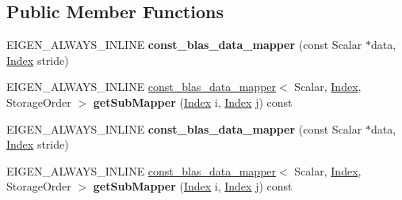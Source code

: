 \subsection*{Public Member Functions}
\begin{DoxyCompactItemize}
\item 
\mbox{\label{class_eigen_1_1internal_1_1const__blas__data__mapper_ae18b6a511e6f40baf1ec5936ee16e248}} 
E\+I\+G\+E\+N\+\_\+\+A\+L\+W\+A\+Y\+S\+\_\+\+I\+N\+L\+I\+NE {\bfseries const\+\_\+blas\+\_\+data\+\_\+mapper} (const Scalar $\ast$data, \hyperlink{namespace_eigen_a62e77e0933482dafde8fe197d9a2cfde}{Index} stride)
\item 
\mbox{\label{class_eigen_1_1internal_1_1const__blas__data__mapper_ae630dbeda283542d68ee615c2cdf4d53}} 
E\+I\+G\+E\+N\+\_\+\+A\+L\+W\+A\+Y\+S\+\_\+\+I\+N\+L\+I\+NE \hyperlink{class_eigen_1_1internal_1_1const__blas__data__mapper}{const\+\_\+blas\+\_\+data\+\_\+mapper}$<$ Scalar, \hyperlink{namespace_eigen_a62e77e0933482dafde8fe197d9a2cfde}{Index}, Storage\+Order $>$ {\bfseries get\+Sub\+Mapper} (\hyperlink{namespace_eigen_a62e77e0933482dafde8fe197d9a2cfde}{Index} i, \hyperlink{namespace_eigen_a62e77e0933482dafde8fe197d9a2cfde}{Index} j) const
\item 
\mbox{\label{class_eigen_1_1internal_1_1const__blas__data__mapper_ae18b6a511e6f40baf1ec5936ee16e248}} 
E\+I\+G\+E\+N\+\_\+\+A\+L\+W\+A\+Y\+S\+\_\+\+I\+N\+L\+I\+NE {\bfseries const\+\_\+blas\+\_\+data\+\_\+mapper} (const Scalar $\ast$data, \hyperlink{namespace_eigen_a62e77e0933482dafde8fe197d9a2cfde}{Index} stride)
\item 
\mbox{\label{class_eigen_1_1internal_1_1const__blas__data__mapper_ae630dbeda283542d68ee615c2cdf4d53}} 
E\+I\+G\+E\+N\+\_\+\+A\+L\+W\+A\+Y\+S\+\_\+\+I\+N\+L\+I\+NE \hyperlink{class_eigen_1_1internal_1_1const__blas__data__mapper}{const\+\_\+blas\+\_\+data\+\_\+mapper}$<$ Scalar, \hyperlink{namespace_eigen_a62e77e0933482dafde8fe197d9a2cfde}{Index}, Storage\+Order $>$ {\bfseries get\+Sub\+Mapper} (\hyperlink{namespace_eigen_a62e77e0933482dafde8fe197d9a2cfde}{Index} i, \hyperlink{namespace_eigen_a62e77e0933482dafde8fe197d9a2cfde}{Index} j) const
\end{DoxyCompactItemize}
